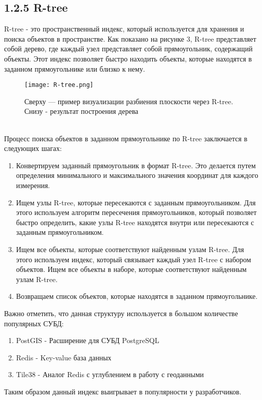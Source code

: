 \subsection{1.2.5 R-tree}
R-tree - это пространственный индекс, который используется для хранения и поиска объектов в пространстве\cite{guttmanRtree}. Как показано на рисунке 3, R-tree представляет собой дерево, где каждый узел представляет собой прямоугольник, содержащий объекты. Этот индекс позволяет быстро находить объекты, которые находятся в заданном прямоугольнике или близко к нему.
  \\
\begin{figure}[h]
    \centering
    \texttt{[image: R-tree.png]}
    \caption{Сверху — пример визуализации разбиения плоскости через R-tree. Снизу - результат построения дерева}
\end{figure}
  \\
Процесс поиска объектов в заданном прямоугольнике по R-tree заключается в следующих шагах:

\begin{enumerate}
    \item Конвертируем заданный прямоугольник в формат R-tree. Это делается путем определения минимального и максимального значения координат для каждого измерения.
    \item Ищем узлы R-tree, которые пересекаются с заданным прямоугольником. Для этого используем алгоритм пересечения прямоугольников, который позволяет быстро определить, какие узлы R-tree находятся внутри или пересекаются с заданным прямоугольником.
    \item Ищем все объекты, которые соответствуют найденным узлам R-tree. Для этого используем индекс, который связывает каждый узел R-tree с набором объектов. Ищем все объекты в наборе, которые соответствуют найденным узлам R-tree.
    \item Возвращаем список объектов, которые находятся в заданном прямоугольнике.
\end{enumerate}

Важно отметить, что данная структуру используется в большом количестве популярных СУБД: 
\begin{enumerate}
    \item PostGIS - Расширение для СУБД PostgreSQL
    \item Redis - Key-value база данных
    \item Tile38 - Аналог Redis с углублением в работу с геоданными
\end{enumerate}
Таким образом данный индекс выигрывает в популярности у разработчиков. 

